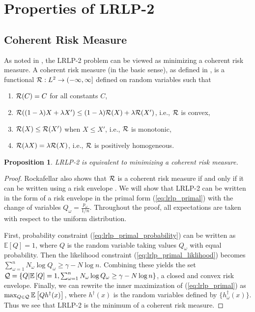 \documentclass[11pt]{article}
\newcommand{\e}[1]{\mathbb{E} \left[ #1 \right]}
\newtheorem{proposition}[theorem]{Proposition}
\begin{document}
\section{Properties of LRLP-2}

\subsection{Coherent Risk Measure}
As noted in \cite{wang2010likelihood}, the LRLP-2 problem can be viewed as minimizing a coherent risk measure.
A coherent risk measure (in the basic sense), as defined in \cite{rockafellar2007coherent}, is a functional ${\cal R}: L^2 \rightarrow (-\infty,\infty]$ defined on random variables such that
\begin{enumerate}
	\item ${\cal R}(C) = C$ for all constants $C$,
	\item ${\cal R}((1-\lambda)X + \lambda X') \leq (1-\lambda){\cal R}(X) + \lambda {\cal R}(X')$, i.e., $\cal R$ is convex,
	\item ${\cal R}(X) \leq {\cal R}(X')$ when $X \leq X'$, i.e., $\cal R$ is monotonic,
	\item ${\cal R}(\lambda X) = \lambda {\cal R}(X)$, i.e., $\cal R$ is positively homogeneous.
\end{enumerate}

\begin{proposition}
	LRLP-2 is equivalent to minimizing a coherent risk measure.
\end{proposition}

\begin{proof}
	Rockafellar also shows that $\cal R$ is a coherent risk measure if and only if it can be written using a risk envelope \cite{rockafellar2007coherent}.
	We will show that LRLP-2 can be written in the form of a risk envelope in the primal form (\ref{eq:lrlp_primal}) with the change of variables $Q_\omega = \frac{p_\omega}{1/n}$.
	Throughout the proof, all expectations are taken with respect to the uniform distribution.
	
	First, probability constraint (\ref{eq:lrlp_primal_probability}) can be written as $\e{Q} = 1$, where $Q$ is the random variable taking values $Q_\omega$ with equal probability.
	Then the likelihood constraint (\ref{eq:lrlp_primal_liklihood}) becomes $\sum_{\omega=1}^n N_\omega \log Q_\omega \geq \gamma - N \log n$.
	Combining these yields the set ${\cal Q} = \{Q | \e{Q} = 1, \sum_{\omega=1}^n N_\omega \log Q_\omega \geq \gamma - N \log n \}$, a closed and convex risk envelope.
	Finally, we can rewrite the inner maximization of (\ref{eq:lrlp_primal}) as $\max_{Q \in {\cal Q}} \e{Qh^\dagger(x)}$, where $h^\dagger(x)$ is the random variables defined by $\{h^\dagger_\omega(x)\}$.
	Thus we see that LRLP-2 is the minimum of a coherent risk measure.
\end{proof}
\end{document}
